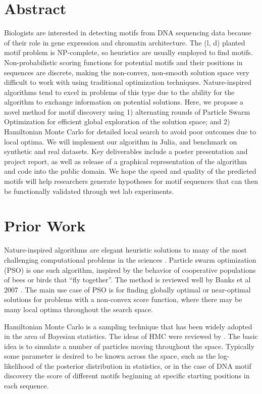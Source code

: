 \documentclass{article}
\begin{document}
\section{Abstract}
Biologists are interested in detecting motifs from DNA sequencing data because of their role in gene expression and chromatin architecture.
The (l, d) planted motif problem is NP-complete, so heuristics are usually employed to find motifs. Non-probabilistic scoring functions for potential motifs and their positions in sequences are discrete, making the non-convex, non-smooth solution space very difficult to work with using traditional optimization techniques. Nature-inspired algorithms tend to excel in problems of this type due to the ability for the algorithm to exchange information on potential solutions. Here, we propose a novel method for motif discovery using 1) alternating rounds of Particle Swarm Optimization for efficient global exploration of the solution space; and 2) Hamiltonian Monte Carlo for detailed local search to avoid poor outcomes due to local optima. We will implement our algorithm in Julia, and benchmark on synthetic and real datasets. Key deliverables include a poster presentation and project report, as well as release of a graphical representation of the algorithm and code into the public domain. We hope the speed and quality of the predicted motifs will help researchers generate hypotheses for motif sequences that can then be functionally validated through wet lab experiments.
\section{Prior Work}
Nature-inspired algorithms are elegant heuristic solutions to many of the most challenging computational problems in the sciences \cite{fister2013brief}. Particle swarm optimization (PSO) is one such algorithm, inspired by the behavior of cooperative populations of bees or birds that ``fly together''. The method is reviewed well by Banks et al 2007 \cite{banks2007review}. The main use case of PSO is for finding globally optimal or near-optimal solutions for problems with a non-convex score function, where there may be many local optima throughout the search space. 
  
    
Hamiltonian Monte Carlo is a sampling technique that has been widely adopted in the area of Bayesian statistics. The ideas of HMC were reviewed by \cite{betancourt2017conceptual}. The basic idea is to simulate a number of particles moving throughout the space. Typically some parameter is desired to be known across the space, such as the log-likelihood of the posterior distribution in statistics, or in the case of DNA motif discovery the score of different motifs beginning at specific starting positions in each sequence.
\end{document}
